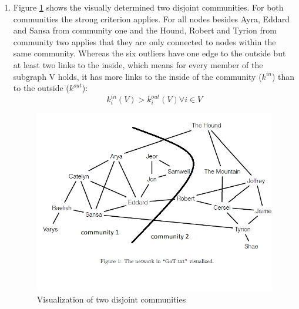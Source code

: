 \documentclass[10pt,a4paper]{article}
\begin{document}
\begin{enumerate}
\item Figure \ref{fig-1} shows the visually determined two disjoint communities. For both communities the strong criterion applies. For all nodes besides Ayra, Eddard and Sansa from community one and the Hound, Robert and Tyrion from community two applies that they are only connected to nodes within the same community. Whereas the six outliers have one edge to the outside but at least two links to the inside, which means for every member of the subgraph V holds, it has more links to the inside of the community ($k^{in}$) than to the outside ($k^{out}$):\\
\begin{equation}
k^{in}_i (V) > k^{out}_i (V) \forall i \in V
\end{equation}
\begin{figure}
\includegraphics[scale=1]{task2c).jpg}
\caption{Visualization of two disjoint communities}
\label{fig-1}
\end{figure}
\end{enumerate}
\end{document}
